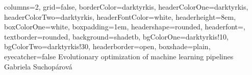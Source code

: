 \documentclass[a0paper,portrait]{baposter}
\begin{document}
\sffamily

\begin{poster}{
  columns=2,
	grid=false,
	borderColor=darktyrkis,
	headerColorOne=darktyrkis,
	headerColorTwo=darktyrkis,
	headerFontColor=white,
  headerheight=8em,
	boxColorOne=white,
  boxpadding=1em,
	headershape=rounded,
	headerfont=\Large\textsf,
	textborder=rounded,
	background=shadetb,
  bgColorOne=darktyrkis!10,
  bgColorTwo=darktyrkis!30,
	headerborder=open,
  boxshade=plain,
  eyecatcher=false
}
{
}
{ \Huge Evolutionary optimization of machine learning pipelines}
{
  \\Gabriela Suchopárová
}
{
}

\small


\end{poster}
\end{document}

